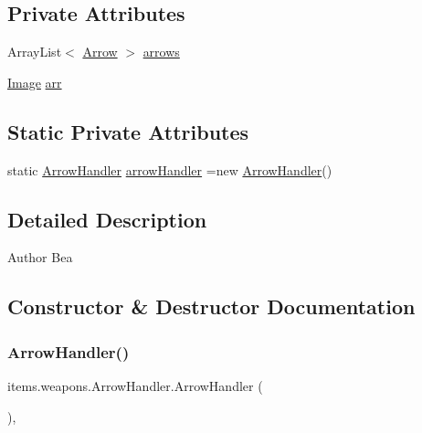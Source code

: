 \subsection*{Private Attributes}
\begin{DoxyCompactItemize}
\item 
Array\+List$<$ \mbox{\hyperlink{classitems_1_1weapons_1_1_arrow}{Arrow}} $>$ \mbox{\hyperlink{classitems_1_1weapons_1_1_arrow_handler_a7038dd7e7fa3db85bcddf0d8601d4271}{arrows}}
\item 
\mbox{\hyperlink{classorg_1_1newdawn_1_1slick_1_1_image}{Image}} \mbox{\hyperlink{classitems_1_1weapons_1_1_arrow_handler_a5d5966436e98e6c2792992e1643fffd5}{arr}}
\end{DoxyCompactItemize}
\subsection*{Static Private Attributes}
\begin{DoxyCompactItemize}
\item 
static \mbox{\hyperlink{classitems_1_1weapons_1_1_arrow_handler}{Arrow\+Handler}} \mbox{\hyperlink{classitems_1_1weapons_1_1_arrow_handler_a1d4f905a340ec4bdccbefeb1a8cac834}{arrow\+Handler}} =new \mbox{\hyperlink{classitems_1_1weapons_1_1_arrow_handler}{Arrow\+Handler}}()
\end{DoxyCompactItemize}


\subsection{Detailed Description}
\begin{DoxyAuthor}{Author}
Bea 
\end{DoxyAuthor}


\subsection{Constructor \& Destructor Documentation}
\mbox{\label{classitems_1_1weapons_1_1_arrow_handler_a8dfa1e68464bdd4eb03007cfc9412948}} 
\subsubsection{\texorpdfstring{Arrow\+Handler()}{ArrowHandler()}}
{\footnotesize\ttfamily items.\+weapons.\+Arrow\+Handler.\+Arrow\+Handler (\begin{DoxyParamCaption}{ }\end{DoxyParamCaption})\hspace{0.3cm}{\ttfamily [inline]}, {\ttfamily [private]}}


